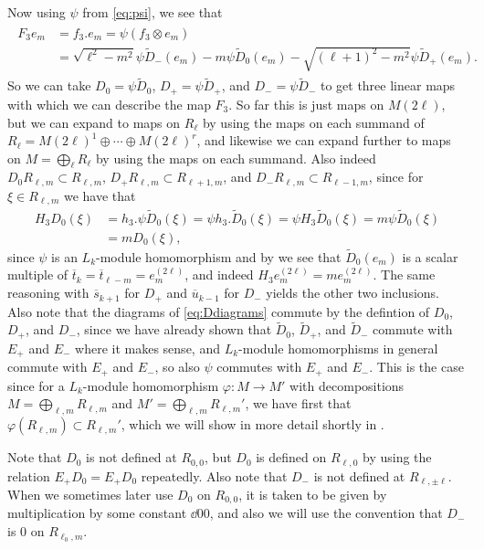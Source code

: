 Now using $\psi$ from \cref{eq:psi}, we see that
\begin{align}\label{eq:F_3action}
  \begin{aligned}
    F_3e_m &= f_3 . e_m = \psi(f_3\otimes e_m) \\
    &= \sqrt{\ell^2-m^2}\psi \widetilde D_-(e_m) - m\psi \widetilde D_0(e_m) - \sqrt{(\ell+1)^2-m^2}\psi \widetilde D_+(e_m).
  \end{aligned}
\end{align}
So we can take $D_0=\psi\widetilde D_0$, $D_+ = \psi\widetilde D_+$, and $D_- = \psi\widetilde D_-$ to get three linear maps with which we can describe the map $F_3$. So far this is just maps on $M(2\ell)$, but we can expand to maps on $R_\ell$ by using the maps on each summand of $R_\ell=M(2\ell)^1 \oplus \dotsb \oplus M(2\ell)^r$, and likewise we can expand further to maps on $M=\bigoplus_\ell R_\ell$ by using the maps on each summand. Also indeed $D_0R_{\ell,m}\subset R_{\ell,m}$, $D_+R_{\ell,m}\subset R_{\ell+1,m}$, and $D_-R_{\ell,m}\subset R_{\ell-1,m}$, since for $\xi\in R_{\ell,m}$ we have that
\begin{align*}
  H_3D_0(\xi) &= h_3 . \psi\widetilde D_0(\xi) = \psi h_3 . \widetilde D_0(\xi) = \psi H_3 \widetilde D_0(\xi) = m\psi \widetilde D_0(\xi) \\
  &= m D_0(\xi),
\end{align*}
since $\psi$ is an $L_k$-module homomorphism and by  we see that $\widetilde D_0(e_m)$ is a scalar multiple of $\overline t_k = \overline t_{\ell-m} = e_m^{(2\ell)}$, and indeed $H_3e_m^{(2\ell)}=me_m^{(2\ell)}$. The same reasoning with $\overline s_{k+1}$ for $D_+$ and $\overline u_{k-1}$ for $D_-$ yields the other two inclusions. Also note that the diagrams of \cref{eq:Ddiagrams} commute by the defintion of $D_0$, $D_+$, and $D_-$, since we have already shown that $\widetilde D_0$, $\widetilde D_+$, and $\widetilde D_-$ commute with $E_+$ and $E_-$ where it makes sense, and $L_k$-module homomorphisms in general commute with $E_+$ and $E_-$, so also $\psi$ commutes with $E_+$ and $E_-$. This is the case since for a $L_k$-module homomorphism $\varphi\colon M\to M'$ with decompositions $M=\bigoplus_{\ell,m} R_{\ell,m}$ and $M'=\bigoplus_{\ell,m} R_{\ell,m}'$, we have first that $\varphi(R_{\ell,m}) \subset R_{\ell,m}'$, which we will show in more detail shortly in .

\begin{remark}
  Note that $D_0$ is not defined at $R_{0,0}$, but $D_0$ is defined on $R_{\ell,0}$ by using the relation $E_+D_0=E_+D_0$ repeatedly. Also note that $D_-$ is not defined at $R_{\ell,\pm \ell}$. When we sometimes later use $D_0$ on $R_{0,0}$, it is taken to be given by multiplication by some constant $\dd{0}{0}$, and also we will use the convention that $D_-$ is $0$ on $R_{\ell_0,m}$.
\end{remark}

